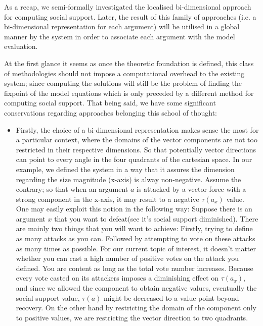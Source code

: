 \documentclass{article}
\begin{document}
{\begin{itemize}
\end{itemize}


As a recap, we semi-formally investigated the localised bi-dimensional approach for computing social support. Later, the result of this family of approaches (i.e. a bi-dimensional representation for each argument) will be utilised in a global manner by the system in order to associate each argument with the model evaluation.


At the first glance it seems as once the theoretic foundation is defined, this class of methodologies should not impose a computational overhead to the existing system; since computing the solutions will still be the problem of finding the fixpoint of the model equations which is only preceded by a different method for computing social support. 
That being said, we have some significant conservations regarding approaches belonging this school of thought:

\begin{itemize}
\item Firstly, the choice of  a bi-dimensional representation makes sense the most for a particular context, where the domains of the vector components are not too restricted in their respective dimensions. So that potentially vector directions can point to every angle in the four quadrants of the cartesian space. In our example, we defined the system in a way that it assures the dimension regarding the size magnitude (x-axis) is alway non-negative. Assume the contrary; so that when an argument $a$ is attacked by a vector-force with a strong component in the x-axis, it may result to a negative $\tau(a_x)$ value. One may easily exploit this notion in the following way: Suppose there is an argument $x$ that you want to defeat(see it's social support diminished). There are mainly two things that you will want to achieve: Firstly, trying to define as many attacks as you can. Followed by attempting to vote on these attacks as many times as possible. For our current topic of interest, it doesn't matter whether you can cast a high number of positive votes on the attack you defined. You are content as long as the total vote number increases. Because every vote casted on its attackers imposes a diminishing effect on $\tau(a_x)$, and since we allowed the component to obtain negative values, eventually the social support value, $\tau(a)$ might be decreased to a value point beyond recovery. On the other hand by restricting the domain of the component only to positive values, we are restricting the vector direction to two quadrants.


\end{itemize}}
\end{document}
